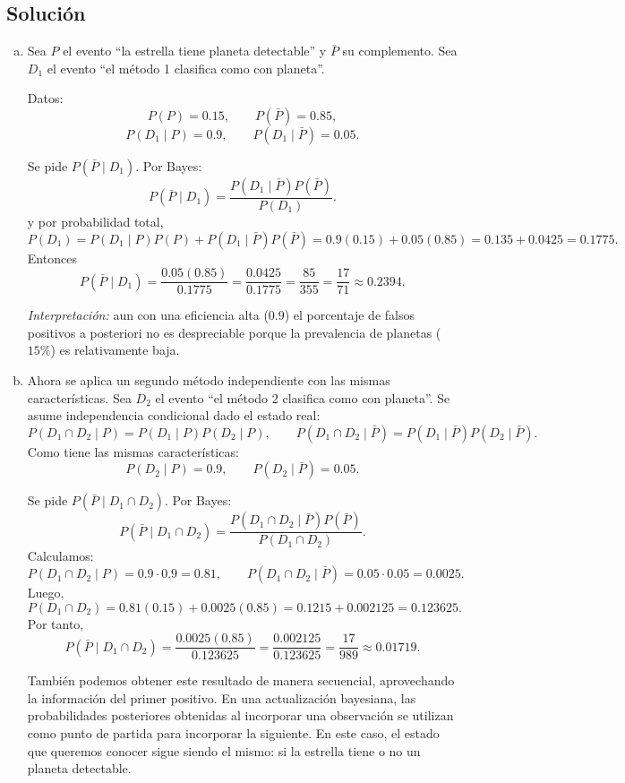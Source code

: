 \documentclass[a4paper]{article}
\begin{document}
\subsection{Solución}
\begin{enumerate}[a.]
\item Sea $P$ el evento ``la estrella tiene planeta detectable'' y $\bar P$ su complemento. Sea $D_1$ el evento ``el método 1 clasifica como con planeta''.

Datos:
$$P(P)=0.15,\qquad P(\bar P)=0.85,$$
$$P(D_1\mid P)=0.9,\qquad P(D_1\mid \bar P)=0.05.$$

Se pide $P(\bar P\mid D_1)$. Por Bayes:
$$
P(\bar P\mid D_1)=\frac{P(D_1\mid \bar P)P(\bar P)}{P(D_1)}.
$$
y por probabilidad total,
$$
P(D_1)=P(D_1\mid P)P(P)+P(D_1\mid \bar P)P(\bar P)
=0.9(0.15)+0.05(0.85)=0.135+0.0425=0.1775.
$$
Entonces
$$
P(\bar P\mid D_1)=\frac{0.05(0.85)}{0.1775}=\frac{0.0425}{0.1775}
=\frac{85}{355}=\frac{17}{71}\approx 0.2394.
$$

\textit{Interpretación:} aun con una eficiencia alta ($0.9$) el porcentaje de falsos positivos a posteriori no es despreciable porque la prevalencia de planetas ($15\%$) es relativamente baja.



\item Ahora se aplica un segundo método independiente con las mismas características. Sea $D_2$ el evento ``el método 2 clasifica como con planeta''. Se asume independencia condicional dado el estado real:
$$
P(D_1\cap D_2\mid P)=P(D_1\mid P)P(D_2\mid P),\qquad
P(D_1\cap D_2\mid \bar P)=P(D_1\mid \bar P)P(D_2\mid \bar P).
$$
Como tiene las mismas características:
$$P(D_2\mid P)=0.9,\qquad P(D_2\mid \bar P)=0.05.$$

Se pide $P(\bar P\mid D_1\cap D_2)$. Por Bayes:
$$
P(\bar P\mid D_1\cap D_2)=\frac{P(D_1\cap D_2\mid \bar P)P(\bar P)}{P(D_1\cap D_2)}.
$$
Calculamos:
$$
P(D_1\cap D_2\mid P)=0.9\cdot 0.9=0.81,
\qquad
P(D_1\cap D_2\mid \bar P)=0.05\cdot 0.05=0.0025.
$$
Luego,
$$
P(D_1\cap D_2)=0.81(0.15)+0.0025(0.85)=0.1215+0.002125=0.123625.
$$
Por tanto,
$$
P(\bar P\mid D_1\cap D_2)=\frac{0.0025(0.85)}{0.123625}
=\frac{0.002125}{0.123625}
=\frac{17}{989}\approx 0.01719.
$$

También podemos obtener este resultado de manera secuencial, aprovechando la información del primer positivo. En una actualización bayesiana, las probabilidades posteriores obtenidas al incorporar una observación se utilizan como punto de partida para incorporar la siguiente. En este caso, el estado que queremos conocer sigue siendo el mismo: si la estrella tiene o no un planeta detectable.


\end{enumerate}
\end{document}
